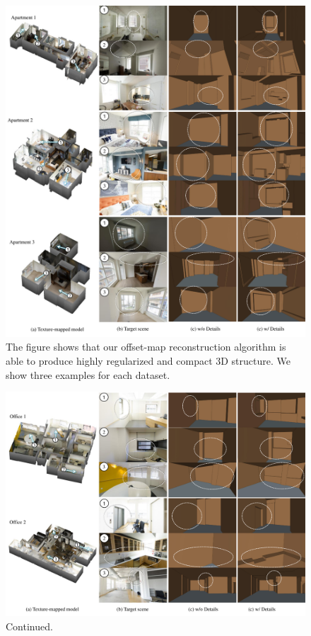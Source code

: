 \clearpage
\begin{figure}[!t]
 \includegraphics[width=\textwidth]{../figures/closeups1.pdf}
	\caption{The figure shows that our offset-map reconstruction
 algorithm is able to produce highly regularized and compact 3D
 structure. We show three examples for each dataset.}
 \label{fig:detail0}
\end{figure}

\clearpage
\begin{figure}[!t]
  \includegraphics[width=\textwidth]{../figures/closeups2.pdf}
 \caption{Continued.}  \label{fig:detail1}
\end{figure}

